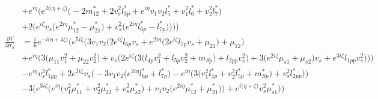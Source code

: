 \begin{align}
 &+e^{i \eta } \Big(e^{2 i \Big(\eta +\zeta \Big)} \Big(-2 m_{12}^*  + 2 v_{s}^{2} l_{3p}^*  + e^{i \eta } v_1 v_2 l_5^*  + v_{1}^{2} l_6^*  + v_{2}^{2} l_7^* \Big)\nonumber \\ 
 &+2 \Big(e^{i \zeta } v_s \Big(e^{2 i \eta } \mu_{12}^*  - \mu_{21}^* \Big) + v_{s}^{2} \Big(e^{2 i \eta } l_{6p}^*  - l_{7p}^* \Big)\Big)\Big)\Big)\\ 
\frac{\partial V}{\partial \sigma_S} &= \frac{i}{6} e^{-i \Big(\eta +4 \zeta \Big)} \Big(e^{5 i \zeta } \Big(3 v_1 v_2 \Big(2 e^{i \zeta } l_{6p} v_s  + e^{2 i \eta } \Big(2 e^{i \zeta } l_{7p} v_s  + \mu_{21}\Big) + \mu_{12}\Big)\nonumber \\ 
 &+e^{i \eta } \Big(3 \Big(\mu_{11} v_{1}^{2}  + \mu_{22} v_{2}^{2} \Big) + v_s \Big(2 e^{i \zeta } \Big(3 \Big(l_{4p} v_{1}^{2}  + l_{5p} v_{2}^{2}  + m_{Sp}\Big) + l_{2pp} v_{s}^{2} \Big) + 3 \Big(e^{2 i \zeta } \mu_{s1}  + \mu_{s2}\Big)v_s  + e^{3 i \zeta } l_{1pp} v_{s}^{2} \Big)\Big)\Big)\nonumber \\ 
 &- e^{i \eta } v_{s}^{3} l_{1pp}^* +2 e^{2 i \zeta } v_s \Big(-3 v_1 v_2 \Big(e^{2 i \eta } l_{6p}^*  + l_{7p}^*\Big) - e^{i \eta } \Big(3 \Big(v_{1}^{2} l_{4p}^*  + v_{2}^{2} l_{5p}^*  + m_{Sp}^*\Big) + v_{s}^{2} l_{2pp}^* \Big)\Big)\nonumber \\ 
 &-3 \Big(e^{3 i \zeta } \Big(e^{i \eta } \Big(v_{1}^{2} \mu_{11}^*  + v_{2}^{2} \mu_{22}^*  + v_{s}^{2} \mu_{s2}^* \Big) + v_1 v_2 \Big(e^{2 i \eta } \mu_{12}^*  + \mu_{21}^*\Big)\Big) + e^{i \Big(\eta +\zeta \Big)} v_{s}^{2} \mu_{s1}^* \Big)\Big)
\end{align} 
